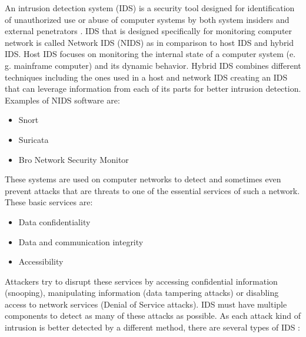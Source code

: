 \documentclass[thesis=B,english]{FITthesis}[2012/10/20]
\begin{document}
An intrusion detection system (IDS) is a security tool designed for identification of unauthorized use or abuse of computer systems by both system insiders and external penetrators \cite{mukherjee1994network}.
IDS that is designed specifically for monitoring computer network is called Network IDS (NIDS) as in comparison to host IDS and hybrid IDS.
Host IDS focuses on monitoring the internal state of a computer system (e. g. mainframe computer) and its dynamic behavior.
Hybrid IDS combines different techniques including the ones used in a host and network IDS creating an IDS that can leverage information from each of its parts for better intrusion detection.
Examples of NIDS software are:                                                    
\begin{itemize}                                                                   
    \item Snort                                                                   
    \item Suricata                                                                
    \item Bro Network Security Monitor                                            
\end{itemize}                                                                     
These systems are used on computer networks to detect and sometimes even prevent attacks that are threats to one of the essential services of such a network.
These basic services are\cite{mukherjee1994network}:                            
\begin{itemize}                                                                   
    \item Data confidentiality                                                    
    \item Data and communication integrity                                        
    \item Accessibility                                                           
\end{itemize}                                                                     
Attackers try to disrupt these services by accessing confidential information (snooping), manipulating information (data tampering attacks) or disabling access to network services (Denial of Service attacks).
IDS must have multiple components to detect as many of these attacks as possible.
As each attack kind of intrusion is better detected by a different method, there are several types of IDS \cite{liao2013intrusion}:
\end{document}
